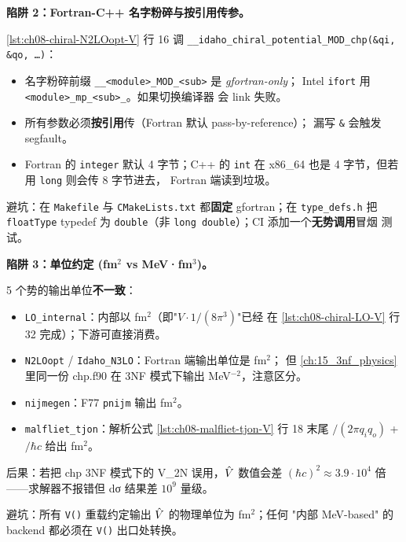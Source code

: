 \begin{pitfallbox}[label={box:ch08-pitfall-fortran-abi}]
\textbf{陷阱 2：Fortran-C++ 名字粉碎与按引用传参。}

\cref{lst:ch08-chiral-N2LOopt-V} 行 16 调
\texttt{\_\_idaho\_chiral\_potential\_MOD\_chp(\&qi, \&qo, \ldots)}：
\begin{itemize}
  \item 名字粉碎前缀 \texttt{\_\_<module>\_MOD\_<sub>} 是 \emph{gfortran-only}；
        Intel \texttt{ifort} 用 \texttt{<module>\_mp\_<sub>\_}。如果切换编译器
        会 link 失败。
  \item 所有参数必须\textbf{按引用}传（Fortran 默认 pass-by-reference）；
        漏写 \texttt{\&} 会触发 segfault。
  \item Fortran 的 \texttt{integer} 默认 4 字节；C++ 的 \texttt{int} 在
        x86\_64 也是 4 字节，但若用 \texttt{long} 则会传 8 字节进去，
        Fortran 端读到垃圾。
\end{itemize}

避坑：在 \texttt{Makefile} 与 \texttt{CMakeLists.txt} 都\textbf{固定}
gfortran；在 \texttt{type\_defs.h} 把 \texttt{floatType} typedef 为
\texttt{double}（非 \texttt{long double}）；CI 添加一个\textbf{无势调用}冒烟
测试。
\end{pitfallbox}

\begin{pitfallbox}
\textbf{陷阱 3：单位约定 (fm\(^{2}\) vs MeV·fm\(^{3}\))。}

5 个势的输出单位\textbf{不一致}：
\begin{itemize}
  \item \texttt{LO\_internal}：内部以 fm\(^{2}\)（即"\(V \cdot 1/(8\pi^3)\)"已经
        在 \cref{lst:ch08-chiral-LO-V} 行 32 完成）；下游可直接消费。
  \item \texttt{N2LOopt} / \texttt{Idaho\_N3LO}：Fortran 端输出单位是 fm\(^{2}\)；
        但 \cref{ch:15_3nf_physics} 里同一份 chp.f90 在 3NF 模式下输出
        MeV\(^{-2}\)，注意区分。
  \item \texttt{nijmegen}：F77 \texttt{pnijm} 输出 fm\(^{2}\)。
  \item \texttt{malfliet\_tjon}：解析公式 \cref{lst:ch08-malfliet-tjon-V}
        行 18 末尾 \(/(2\pi q_i q_o)\) + \(/\hbar c\) 给出 fm\(^{2}\)。
\end{itemize}

后果：若把 chp 3NF 模式下的 V\_2N 误用，\(\hat{V}\) 数值会差 \((\hbar c)^2 \approx
3.9 \cdot 10^4\) 倍——求解器不报错但 dσ 结果差 \(10^9\) 量级。

避坑：所有 \texttt{V()} 重载约定输出 \(\hat{V}\) 的物理单位为 fm\(^{2}\)；任何
"内部 MeV-based" 的 backend 都必须在 \texttt{V()} 出口处转换。
\end{pitfallbox}

